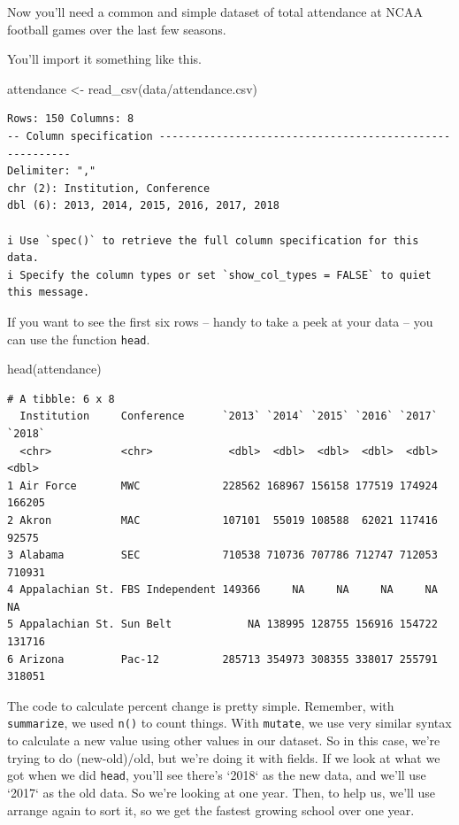 \documentclass[
  letterpaper,
  DIV=11,
  numbers=noendperiod]{scrreprt}
\newenvironment{Shaded}{\begin{snugshade}}{\end{snugshade}}
\newcommand{\FunctionTok}[1]{\textcolor[rgb]{0.28,0.35,0.67}{#1}}
\newcommand{\NormalTok}[1]{\textcolor[rgb]{0.00,0.23,0.31}{#1}}
\newcommand{\OtherTok}[1]{\textcolor[rgb]{0.00,0.23,0.31}{#1}}
\newcommand{\StringTok}[1]{\textcolor[rgb]{0.13,0.47,0.30}{#1}}
\begin{document}
Now you'll need a common and simple dataset of total attendance at NCAA
football games over the last few seasons.

You'll import it something like this.

\begin{Shaded}
\begin{Highlighting}[]
\NormalTok{attendance }\OtherTok{\textless{}{-}} \FunctionTok{read\_csv}\NormalTok{(}\StringTok{\textquotesingle{}data/attendance.csv\textquotesingle{}}\NormalTok{)}
\end{Highlighting}
\end{Shaded}

\begin{verbatim}
Rows: 150 Columns: 8
-- Column specification --------------------------------------------------------
Delimiter: ","
chr (2): Institution, Conference
dbl (6): 2013, 2014, 2015, 2016, 2017, 2018

i Use `spec()` to retrieve the full column specification for this data.
i Specify the column types or set `show_col_types = FALSE` to quiet this message.
\end{verbatim}

If you want to see the first six rows -- handy to take a peek at your
data -- you can use the function \texttt{head}.

\begin{Shaded}
\begin{Highlighting}[]
\FunctionTok{head}\NormalTok{(attendance)}
\end{Highlighting}
\end{Shaded}

\begin{verbatim}
# A tibble: 6 x 8
  Institution     Conference      `2013` `2014` `2015` `2016` `2017` `2018`
  <chr>           <chr>            <dbl>  <dbl>  <dbl>  <dbl>  <dbl>  <dbl>
1 Air Force       MWC             228562 168967 156158 177519 174924 166205
2 Akron           MAC             107101  55019 108588  62021 117416  92575
3 Alabama         SEC             710538 710736 707786 712747 712053 710931
4 Appalachian St. FBS Independent 149366     NA     NA     NA     NA     NA
5 Appalachian St. Sun Belt            NA 138995 128755 156916 154722 131716
6 Arizona         Pac-12          285713 354973 308355 338017 255791 318051
\end{verbatim}

The code to calculate percent change is pretty simple. Remember, with
\texttt{summarize}, we used \texttt{n()} to count things. With
\texttt{mutate}, we use very similar syntax to calculate a new value
using other values in our dataset. So in this case, we're trying to do
(new-old)/old, but we're doing it with fields. If we look at what we got
when we did \texttt{head}, you'll see there's `2018` as the new data,
and we'll use `2017` as the old data. So we're looking at one year.
Then, to help us, we'll use arrange again to sort it, so we get the
fastest growing school over one year.
\end{document}
